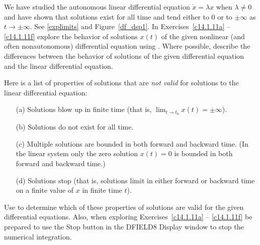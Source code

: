 \documentclass{ximera}
\begin{document}
\CEXER

\noindent We have studied the autonomous linear differential equation 
$\dot{x}=\lambda x$ when $\lambda\neq 0$ and have shown that solutions 
exist for all time and tend either to $0$ or to $\pm\infty$ as $t\to\pm\infty$.
See \eqref{explimits} and Figure~\ref{df_dsp1}.  In Exercises~\ref{c14.1.11a} -- 
\ref{c14.1.11f} explore the behavior of solutions $x(t)$ of the given 
nonlinear (and often nonautonomous) differential equation using {\dfield}.  
Where possible, describe the differences between the behavior of solutions of 
the given differential equation and the linear differential equation.  

  Here is a list of properties of solutions that are 
{\em not valid\/} for solutions to the linear differential equation:
\begin{itemize}
\item[(a)]  Solutions blow up in finite time (that is, 
$\lim_{t\to t_0}x(t)=\pm\infty$).
\item[(b)]  Solutions do not exist for all time.
\item[(c)]  Multiple solutions are bounded in both forward and backward time.
(In the linear system only the zero solution $x(t)=0$ is bounded in both 
forward and backward time.)
\item[(d)]  Solutions stop (that is, solutions limit in either forward or 
backward time on a finite value of $x$ in finite time $t$).
\end{itemize}
Use {\dfield} to determine which of these properties of solutions are 
valid for the given differential equations.  Also, when exploring 
Exercises~\ref{c14.1.11a} -- \ref{c14.1.11f} be prepared to use the {\sf Stop}
button in the {\sf DFIELD8 Display} window to stop the numerical integration. 
\end{document}
